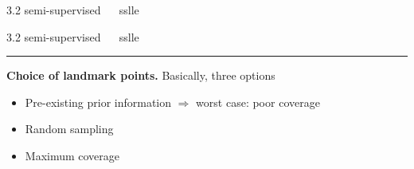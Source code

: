 \documentclass[11pt, compress, t, notes = noshow, xcolor = table, 
aspectratio = 1610]{beamer}
\newcommand{\highlight}[1]{\textcolor{highlightcol}{\textbf{#1}}}
\newcommand{\arritem}{\item[\highlight{$\rightarrow$}]}
\begin{document}
\begin{frame}{\textcolor{gray!90}{3.2 semi-supervised} ~~ sslle}
\end{frame}


\LARGE
\begin{frame}{\textcolor{gray!90}{3.2 semi-supervised} ~~ sslle}
\normalsize
\vspace{-0.5cm}
\noindent \textcolor{gray!90}{\rule{\textwidth}{1pt}}
\smallskip

\textbf{Choice of landmark points.} Basically, three options

\begin{itemize}
  \arritem Pre-existing prior information $\Rightarrow$ worst case: poor 
  coverage
  \arritem Random sampling
  \arritem Maximum coverage
\end{itemize}



\end{frame}
\end{document}
